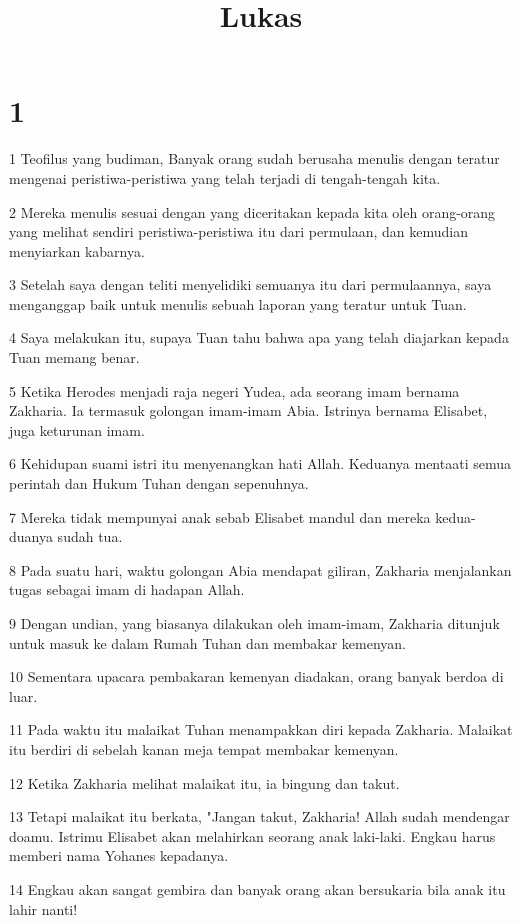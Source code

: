 

\title{Lukas}


\chapter{1}

\par 1 Teofilus yang budiman, Banyak orang sudah berusaha menulis dengan teratur mengenai peristiwa-peristiwa yang telah terjadi di tengah-tengah kita.
\par 2 Mereka menulis sesuai dengan yang diceritakan kepada kita oleh orang-orang yang melihat sendiri peristiwa-peristiwa itu dari permulaan, dan kemudian menyiarkan kabarnya.
\par 3 Setelah saya dengan teliti menyelidiki semuanya itu dari permulaannya, saya menganggap baik untuk menulis sebuah laporan yang teratur untuk Tuan.
\par 4 Saya melakukan itu, supaya Tuan tahu bahwa apa yang telah diajarkan kepada Tuan memang benar.
\par 5 Ketika Herodes menjadi raja negeri Yudea, ada seorang imam bernama Zakharia. Ia termasuk golongan imam-imam Abia. Istrinya bernama Elisabet, juga keturunan imam.
\par 6 Kehidupan suami istri itu menyenangkan hati Allah. Keduanya mentaati semua perintah dan Hukum Tuhan dengan sepenuhnya.
\par 7 Mereka tidak mempunyai anak sebab Elisabet mandul dan mereka kedua-duanya sudah tua.
\par 8 Pada suatu hari, waktu golongan Abia mendapat giliran, Zakharia menjalankan tugas sebagai imam di hadapan Allah.
\par 9 Dengan undian, yang biasanya dilakukan oleh imam-imam, Zakharia ditunjuk untuk masuk ke dalam Rumah Tuhan dan membakar kemenyan.
\par 10 Sementara upacara pembakaran kemenyan diadakan, orang banyak berdoa di luar.
\par 11 Pada waktu itu malaikat Tuhan menampakkan diri kepada Zakharia. Malaikat itu berdiri di sebelah kanan meja tempat membakar kemenyan.
\par 12 Ketika Zakharia melihat malaikat itu, ia bingung dan takut.
\par 13 Tetapi malaikat itu berkata, "Jangan takut, Zakharia! Allah sudah mendengar doamu. Istrimu Elisabet akan melahirkan seorang anak laki-laki. Engkau harus memberi nama Yohanes kepadanya.
\par 14 Engkau akan sangat gembira dan banyak orang akan bersukaria bila anak itu lahir nanti!
